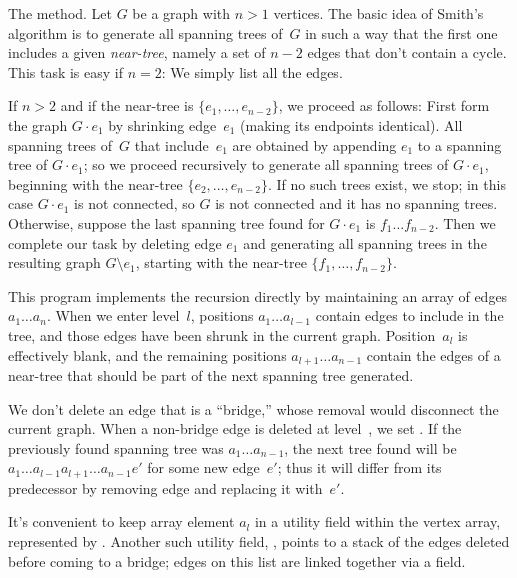 The method. Let $G$ be a graph with $n>1$ vertices.
The basic idea of Smith's algorithm is to generate all spanning trees of~$G$
in such a way that the first one includes a given {\it near-tree}, namely
a set of $n-2$ edges that don't contain a cycle. This task is easy if $n=2$:
We simply list all the edges.

If $n>2$ and if the near-tree is $\{e_1,\ldots,e_{n-2}\}$, we proceed as
follows: First form the graph $G\cdot e_1$ by shrinking edge~$e_1$ (making its
endpoints identical). All spanning trees of~$G$ that include~$e_1$ are
obtained by appending $e_1$ to a spanning tree of $G\cdot e_1$; so we
proceed recursively to generate all spanning trees of $G\cdot e_1$,
beginning with the near-tree $\{e_2,\ldots,e_{n-2}\}$. If no such
trees exist, we stop; in this case $G\cdot e_1$ is not connected,
so $G$ is not connected and it has no spanning trees.
Otherwise, suppose the last spanning tree found
for $G\cdot e_1$ is $f_1\ldots f_{n-2}$. Then we complete our task by
deleting edge $e_1$ and generating all spanning trees in the resulting
graph $G\setminus e_1$, starting with the near-tree $\{f_1,\ldots,f_{n-2}\}$.

\fi

This program implements the recursion directly by maintaining an array
of edges $a_1\ldots a_n$. When we enter level~$l$, positions $a_1\ldots
a_{l-1}$ contain edges to include in the tree, and those edges have
been shrunk in the current graph. Position~$a_l$ is effectively blank,
and the remaining positions $a_{l+1}\ldots a_{n-1}$ contain the edges
of a near-tree that should be part of the next spanning tree generated.

We don't delete an edge that is a ``bridge,'' whose removal
would disconnect the current graph. When a non-bridge edge  is deleted
at
level~, we set . If the previously
found spanning tree was $a_1\ldots a_{n-1}$, the next tree found
will be $a_1\ldots a_{l-1}a_{l+1}\ldots a_{n-1}e'$ for some new edge~$e'$;
thus it will differ from its predecessor by removing edge 
and replacing it with~$e'$.

It's convenient to keep array element $a_l$ in a utility field within
the vertex array, represented by . Another such utility field,
, points to a stack of the edges deleted before coming
to a bridge; edges on this list are linked together via a  field.

